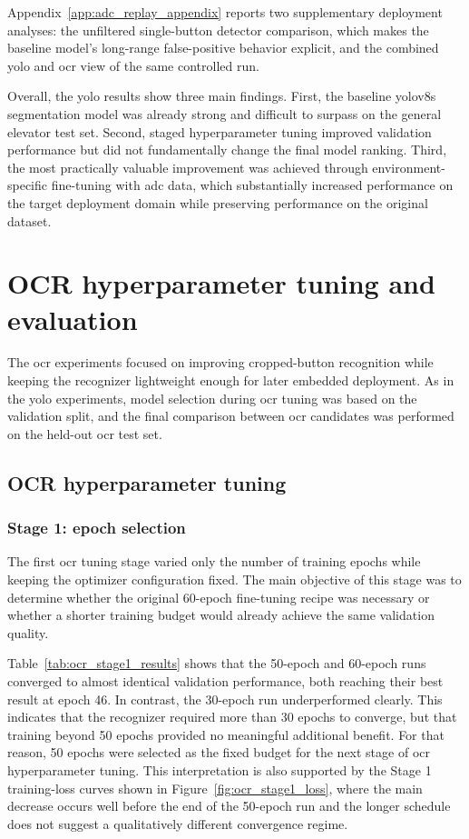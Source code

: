 Appendix~\ref{app:adc_replay_appendix} reports two supplementary deployment analyses:
the unfiltered single-button detector comparison, which makes the baseline model's long-range
false-positive behavior explicit, and the combined \gls{yolo} and \gls{ocr} view of the same
controlled run.

Overall, the \gls{yolo} results show three main findings. First, the baseline
\gls{yolo}v8s segmentation model was already strong and difficult to surpass on the general
elevator test set. Second, staged hyperparameter tuning improved validation
performance but did not fundamentally change the final model ranking. Third, the
most practically valuable improvement was achieved through environment-specific
fine-tuning with \gls{adc} data, which substantially increased performance on the
target deployment domain while preserving performance on the original dataset.

\section{OCR hyperparameter tuning and evaluation}

The \gls{ocr} experiments focused on improving cropped-button recognition while keeping
the recognizer lightweight enough for later embedded deployment. As in the
\gls{yolo} experiments, model selection during \gls{ocr} tuning was based on the
validation split, and the final comparison between \gls{ocr} candidates was performed on
the held-out \gls{ocr} test set.

\subsection{OCR hyperparameter tuning}

\subsubsection{Stage 1: epoch selection}

The first \gls{ocr} tuning stage varied only the number of training epochs while keeping
the optimizer configuration fixed. The main objective of this stage was to
determine whether the original 60-epoch fine-tuning recipe was necessary or
whether a shorter training budget would already achieve the same validation
quality.

Table~\ref{tab:ocr_stage1_results} shows that the 50-epoch and 60-epoch runs
converged to almost identical validation performance, both reaching their best
result at epoch 46. In contrast, the 30-epoch run underperformed clearly. This
indicates that the recognizer required more than 30 epochs to converge, but that
training beyond 50 epochs provided no meaningful additional benefit. For that
reason, 50 epochs were selected as the fixed budget for the next stage of \gls{ocr}
hyperparameter tuning. This interpretation is also supported by the Stage 1
training-loss curves shown in Figure~\ref{fig:ocr_stage1_loss}, where the main
decrease occurs well before the end of the 50-epoch run and the longer schedule
does not suggest a qualitatively different convergence regime.

